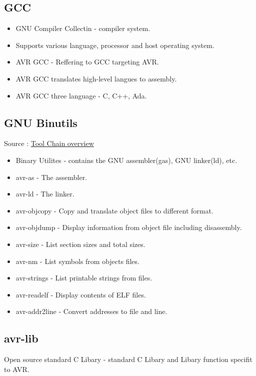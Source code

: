 \documentclass{article}
\begin{document}
\justify

\subsection*{GCC\cite{toolChain}}
\begin{itemize}
    \item GNU Compiler Collectin - compiler system.
    \item Supports various language, processor and host operating system.
    \item AVR GCC - Reffering to GCC targeting AVR.
    \item AVR GCC translates high-level langues to assembly.
    \item AVR GCC three language - C, C++, Ada.
\end{itemize}

\subsection*{GNU Binutils\cite{toolChain}} 
Source : \href{https://www.nongnu.org/avr-libc/user-manual/overview.html}{Tool Chain overview}
\begin{itemize}
    \item Binary Utilites - contains the GNU assembler(gas), GNU linker(ld), etc.
    \item avr-as - The assembler.
    \item avr-ld - The linker.
    \item avr-objcopy - Copy and translate object files to different format.
    \item avr-objdump - Display information from object file including disassembly.
    \item avr-size - List section sizes and total sizes.
    \item avr-nm - List symbols from objects files.
    \item avr-strings - List printable strings from files.
    \item avr-readelf - Display contents of ELF files.
    \item avr-addr2line - Convert addresses to file and line.
\end{itemize}

\subsection*{avr-lib\cite{toolChain}}
\quad Open source standard C Libary - standard C Libary and Libary function specifit to AVR.
\end{document}
